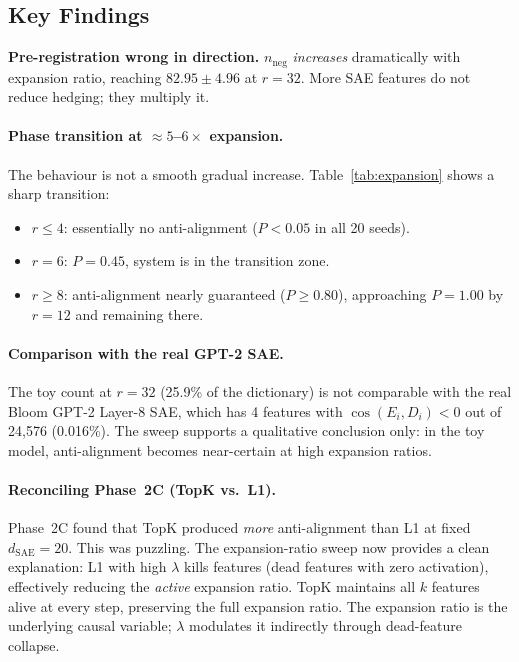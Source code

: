 \documentclass[11pt,a4paper]{article}
\newcommand{\cosED}{\cos(E_i, D_i)}
\newcommand{\nneg}{n_{\mathrm{neg}}}
\begin{document}
\subsection{Key Findings}

\begin{revealed}
\textbf{Pre-registration wrong in direction.}  $\nneg$ \emph{increases} dramatically
with expansion ratio, reaching $82.95\pm4.96$ at $r{=}32$.  More SAE features do not
reduce hedging; they multiply it.
\end{revealed}

\paragraph{Phase transition at $\approx 5$--$6\times$ expansion.}
The behaviour is not a smooth gradual increase.  Table~\ref{tab:expansion} shows a
sharp transition:
\begin{itemize}[noitemsep]
  \item $r \le 4$: essentially no anti-alignment ($P{<}0.05$ in all 20 seeds).
  \item $r = 6$: $P{=}0.45$, system is in the transition zone.
  \item $r \ge 8$: anti-alignment nearly guaranteed ($P{\ge}0.80$), approaching
    $P{=}1.00$ by $r{=}12$ and remaining there.
\end{itemize}

\paragraph{Comparison with the real GPT-2 SAE.}
The toy count at $r{=}32$ (25.9\% of the dictionary) is not comparable with the real Bloom
GPT-2 Layer-8 SAE, which has 4 features with $\cosED<0$ out of 24{,}576 (0.016\%).
The sweep supports a qualitative conclusion only: in the toy model, anti-alignment becomes
near-certain at high expansion ratios.

\paragraph{Reconciling Phase~2C (TopK vs.\ L1).}
Phase~2C found that TopK produced \emph{more} anti-alignment than L1
at fixed $d_{\mathrm{SAE}}{=}20$.  This was puzzling.  The expansion-ratio sweep now
provides a clean explanation: L1 with high $\lambda$ kills features (dead features
with zero activation), effectively reducing the \emph{active} expansion ratio.
TopK maintains all $k$ features alive at every step, preserving the full expansion
ratio.  The expansion ratio is the underlying causal variable; $\lambda$ modulates it
indirectly through dead-feature collapse.
\end{document}
